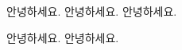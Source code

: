 \documentclass{oblivoir}
\begin{document}
	안녕하세요.
	\large{안녕하세요.}
	\Large{안녕하세요.} 
	
	\huge{안녕하세요.} 
	\Huge{안녕하세요.}
\end{document}
